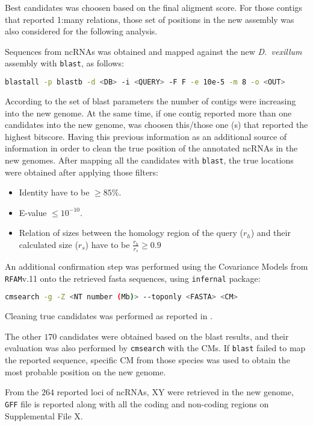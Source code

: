 \documentclass[11pt]{article}
\begin{document}
Best candidates was choosen based on the final aligment score. For those
contigs that reported 1:many relations, those set of positions in the new
assembly was also considered for the following analysis.

Sequences from ncRNAs was obtained and mapped against the new \textit{D.\
vexillum} assembly with \texttt{blast}, as follows:

\begin{lstlisting}[language=bash, breaklines=true]
blastall -p blastb -d <DB> -i <QUERY> -F F -e 10e-5 -m 8 -o <OUT>
\end{lstlisting}

According to the set of blast parameters the number of contigs were increasing
into the new genome. At the same time, if one contig reported more than one
candidates into the new genome, was choosen this/those one (s) that reported the 
highest bitscore. Having this previous information as an additional source of 
information in order to clean the true position of the annotated ncRNAs in the
new genomes. After mapping all the candidates with \texttt{blast}, the true locations
were obtained after applying those filters:
\begin{itemize}
 \item Identity have to be $\geq 85$\%.
 \item E-value $\leq 10^{-10}$.
 \item Relation of sizes between the homology region of the query
  ($r_h$) and their calculated size ($r_s$) have to be $\frac{r_h}{r_s} \geq 0.9$
\end{itemize}

An additional confirmation step was performed using the Covariance Models from
\texttt{RFAM}v.11 onto the retrieved fasta sequences, using \texttt{infernal} package:
\begin{lstlisting}[language=bash, breaklines=true]
cmsearch -g -Z <NT number (Mb)> --toponly <FASTA> <CM>
\end{lstlisting}

Cleaning true candidates was performed as reported in \cite{}.

The other $170$ candidates were obtained based on the blast results, and 
their evaluation was also performed  by \texttt{cmsearch} with the CMs. If 
\texttt{blast} failed to map the reported sequence, specific CM from those 
species was used to obtain the most probable position on the new genome.

From the $264$ reported loci of ncRNAs, XY were retrieved in the
new genome, \texttt{GFF} file is reported along with all the coding and non-coding
regions on Supplemental File X.
\end{document}
